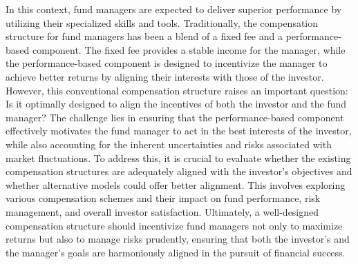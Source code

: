 \documentclass[11pt,a4paper]{article}
\theoremstyle{thmstyleone}%
\theoremstyle{thmstyletwo}%
\theoremstyle{thmstylethree}%
\begin{document}
In this context, fund managers are expected to deliver superior performance by utilizing their specialized skills and tools. Traditionally, the compensation structure for fund managers has been a blend of a fixed fee and a performance-based component. The fixed fee provides a stable income for the manager, while the performance-based component is designed to incentivize the manager to achieve better returns by aligning their interests with those of the investor. However, this conventional compensation structure raises an important question: Is it optimally designed to align the incentives of both the investor and the fund manager? The challenge lies in ensuring that the performance-based component effectively motivates the fund manager to act in the best interests of the investor, while also accounting for the inherent uncertainties and risks associated with market fluctuations.
To address this, it is crucial to evaluate whether the existing compensation structures are adequately aligned with the investor’s objectives and whether alternative models could offer better alignment. This involves exploring various compensation schemes and their impact on fund performance, risk management, and overall investor satisfaction. Ultimately, a well-designed compensation structure should incentivize fund managers not only to maximize returns but also to manage risks prudently, ensuring that both the investor’s and the manager’s goals are harmoniously aligned in the pursuit of financial success.\\
\end{document}
